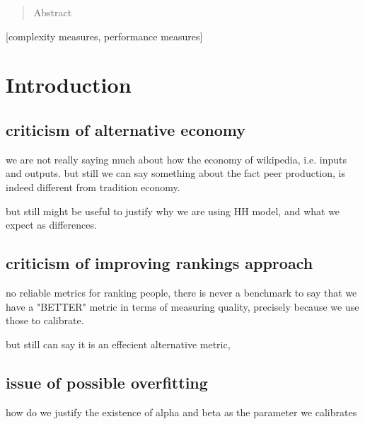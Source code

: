 \documentclass{acm_proc_article-sp}
\begin{document}
\date{14 February 2014}

\maketitle
\begin{abstract}
Abstract
\end{abstract}

[complexity measures, performance measures]



\section{Introduction}

\subsection{criticism of alternative economy}
we are not really saying much about how the economy of wikipedia, i.e. inputs and outputs.
but still we can say something about the fact peer production, is indeed different from tradition economy.

but still might be useful to justify why we are using HH model, and what we expect as differences. 


\subsection{criticism of improving rankings approach}
no reliable metrics for ranking people, there is never a benchmark to say that we have a "BETTER" metric in terms of measuring quality, precisely because we use those to calibrate.

but still can say it is an effecient alternative metric, 

\subsection{issue of possible overfitting}
how do we justify the existence of alpha and beta as the parameter we calibrates
\end{document}
